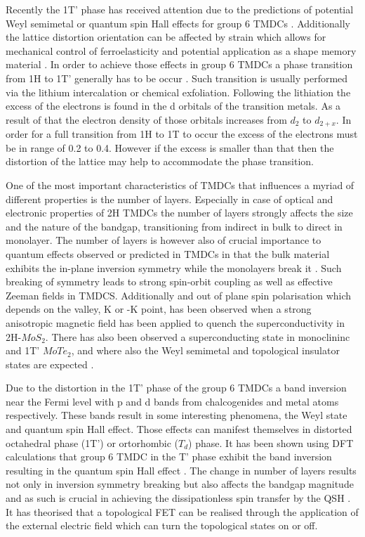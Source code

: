 Recently the 1T' phase has received attention due to the predictions of potential Weyl semimetal or quantum spin Hall effects for group 6 TMDCs \cite{Qian2014}\cite{Sun2015}. Additionally the lattice distortion orientation can be affected by strain which allows for mechanical control of ferroelasticity and potential application as a shape memory material \cite{Li2016}. In order to achieve those effects in group 6 TMDCs a phase transition from 1H to 1T' generally has to be occur \cite{Chhowalla2013}. Such transition is usually performed via the lithium intercalation or chemical exfoliation. Following the lithiation the excess of the electrons is found in the d orbitals of the transition metals. As a result of that the electron density of those orbitals increases from $d_2$ to $d_{2+x}$. In order for a full transition from 1H to 1T to occur the excess of the electrons must be in range of 0.2 to 0.4. However if the excess is smaller than that then the distortion of the lattice may help to accommodate the phase transition.

One of the most important characteristics of TMDCs that influences a myriad of different properties is the number of layers. Especially in case of optical and electronic properties of 2H TMDCs the number of layers strongly affects the size and the nature of the bandgap, transitioning from indirect in bulk to direct in monolayer. The number of layers is however also of crucial importance to quantum effects observed or predicted in TMDCs in that the bulk material exhibits the in-plane inversion symmetry while the monolayers break it \cite{Saito2015}\cite{Lu2015}. Such breaking of symmetry leads to strong spin-orbit coupling as well as effective Zeeman fields in TMDCS. Additionally and out of plane spin polarisation which depends on the valley, K or -K point, has been observed when a strong anisotropic magnetic field has been applied to quench the superconductivity in 2H-$MoS_2$. There has also been observed a superconducting state in monoclininc and 1T' $MoTe_2$, and where also the Weyl semimetal and topological insulator states are expected \cite{Qian2014}\cite{Sun2015}\cite{Qi2016}.

Due to the distortion in the 1T' phase of the group 6 TMDCs a band inversion near the Fermi level with p and d bands from chalcogenides and metal atoms respectively. These bands result in some interesting phenomena, the Weyl state and quantum spin Hall effect. Those effects can manifest themselves in distorted octahedral phase (1T') or ortorhombic ($T_d$) phase. It has been shown using DFT calculations that group 6 TMDC in the T' phase exhibit the band inversion resulting in the quantum spin Hall effect \cite{Qian2014}\cite{Choe2016}. The change in number of layers results not only in inversion symmetry breaking but also affects the bandgap magnitude and as such is crucial in achieving the dissipationless spin transfer by the QSH \cite{Kane2005}\cite{Konig2007}. It has theorised that a topological FET can be realised through the application of the external electric field which can turn the topological states on or off.


